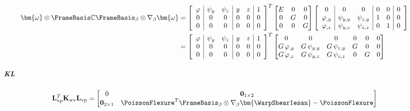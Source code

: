 \begin{ComponentExpression}
$$\begin{aligned}
\end{aligned}
$$
$$
\begin{aligned}
\bm{\omega}\otimes\FrameBasis \mathbb{C}\FrameBasis_{\beta}\otimes\nabla_{\beta}\bm{\omega}
&= 
\left[\begin{array}{c|cc|cc|c}
  \varphi & \psi_{y} & \psi_{z} &  y & z & 1 \\
  0 & 0 & 0                     &  0 & 0 & 0 \\
  0 & 0 & 0                     &  0 & 0 & 0 \\
\end{array}\right]^T
\begin{bmatrix}
E & 0 & 0 \\
0 & G & 0 \\
0 & 0 & G
\end{bmatrix}
\left[\begin{array}{c|cc|cc|cc|c}
  0 & 0 & 0 & 0 & 0 & 0\\
  \varphi_{,y} & \psi_{y,y} & \psi_{z,y} & 1 & 0 & 0 \\
  \varphi_{,z} & \psi_{y,z} & \psi_{z,z} & 0 & 1 & 0 \\
\end{array}\right] \\
&= 
\left[\begin{array}{c|cc|cc|c}
  \varphi & \psi_{y} & \psi_{z} &  y & z & 1 \\
  0 & 0 & 0                     &  0 & 0 & 0 \\
  0 & 0 & 0                     &  0 & 0 & 0 \\
\end{array}\right]^T
\begin{bmatrix}
               0 &             0 &             0 & 0 & 0 & 0 \\
 G\,\varphi_{,y} & G\,\psi_{y,y} & G\,\psi_{z,y} & G & 0 & 0 \\
 G\,\varphi_{,z} & G\,\psi_{y,z} & G\,\psi_{z,z} & 0 & G & 0
\end{bmatrix}
\end{aligned}
$$

\end{ComponentExpression}

\subparagraph{KL}

\[
\mathbf{L}^T_{\rm vp}\mathbf{K}_{\rm wv}\mathbf{L}_{\rm vp} = 
\begin{bmatrix}
    0 & \mathbf{0}_{1\times2} \\
\mathbf{0}_{2\times1} & \PoissonFlexure^T\FrameBasis_{\beta}\otimes\nabla_{\beta}\bm{\WarpShearIesan} - \PoissonFlexure
\end{bmatrix}
\]

